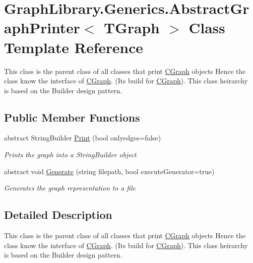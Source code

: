 \hypertarget{class_graph_library_1_1_generics_1_1_abstract_graph_printer}{}\section{Graph\+Library.\+Generics.\+Abstract\+Graph\+Printer$<$ T\+Graph $>$ Class Template Reference}
\label{class_graph_library_1_1_generics_1_1_abstract_graph_printer}


This class is the parent class of all classes that print \hyperlink{class_graph_library_1_1_c_graph}{C\+Graph} objects Hence the class know the interface of \hyperlink{class_graph_library_1_1_c_graph}{C\+Graph}. (Its build for \hyperlink{class_graph_library_1_1_c_graph}{C\+Graph}). This class heirarchy is based on the Builder design pattern.  


\subsection*{Public Member Functions}
\begin{DoxyCompactItemize}
\item 
abstract String\+Builder \hyperlink{class_graph_library_1_1_generics_1_1_abstract_graph_printer_a793fd0ab2baf6809eee04292d3992ce4}{Print} (bool onlyedges=false)
\begin{DoxyCompactList}\small\item\em Prints the graph into a String\+Builder object \end{DoxyCompactList}\item 
abstract void \hyperlink{class_graph_library_1_1_generics_1_1_abstract_graph_printer_ae58857c9c21ef8ab2cd8a0651340e2ec}{Generate} (string filepath, bool execute\+Generator=true)
\begin{DoxyCompactList}\small\item\em Generates the graph representation to a file \end{DoxyCompactList}\end{DoxyCompactItemize}


\subsection{Detailed Description}
This class is the parent class of all classes that print \hyperlink{class_graph_library_1_1_c_graph}{C\+Graph} objects Hence the class know the interface of \hyperlink{class_graph_library_1_1_c_graph}{C\+Graph}. (Its build for \hyperlink{class_graph_library_1_1_c_graph}{C\+Graph}). This class heirarchy is based on the Builder design pattern. 



